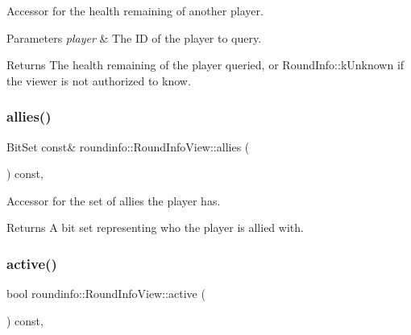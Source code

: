 Accessor for the health remaining of another player. 


\begin{DoxyParams}{Parameters}
{\em player} & The ID of the player to query. \\
\hline
\end{DoxyParams}
\begin{DoxyReturn}{Returns}
The health remaining of the player queried, or {\ttfamily Round\+Info\+::k\+Unknown} if the viewer is not authorized to know. 
\end{DoxyReturn}
\mbox{\label{classroundinfo_1_1_round_info_view_af00b23d7a3f2fa21fd3cbba1f71e0fd4}} 
\subsubsection{\texorpdfstring{allies()}{allies()}}
{\footnotesize\ttfamily Bit\+Set const\& roundinfo\+::\+Round\+Info\+View\+::allies (\begin{DoxyParamCaption}{ }\end{DoxyParamCaption}) const\hspace{0.3cm}{\ttfamily [inline]}, {\ttfamily [noexcept]}}



Accessor for the set of allies the player has. 

\begin{DoxyReturn}{Returns}
A bit set representing who the player is allied with. 
\end{DoxyReturn}
\mbox{\label{classroundinfo_1_1_round_info_view_a1ff1802f7ab8e24008f02bbc0169a160}} 
\subsubsection{\texorpdfstring{active()}{active()}}
{\footnotesize\ttfamily bool roundinfo\+::\+Round\+Info\+View\+::active (\begin{DoxyParamCaption}{ }\end{DoxyParamCaption}) const\hspace{0.3cm}{\ttfamily [inline]}, {\ttfamily [noexcept]}}



